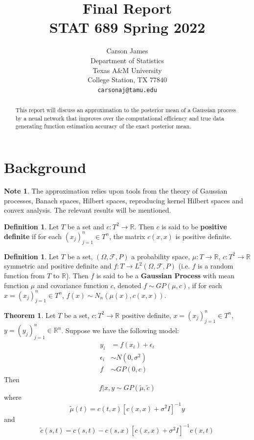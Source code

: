 \documentclass{article}
\title{Final Report \\ STAT 689 Spring 2022 }
\author{%
  Carson James\\
  Department of Statistics\\
  Texas A\&M University\\
  College Station, TX 77840 \\
  \texttt{carsonaj@tamu.edu} \\
}
\theoremstyle{definition}
\newtheorem{defn}[definition]{Definition}
\newtheorem{note}[definition]{Note}
\newtheorem{thm}[definition]{Theorem}
\newcommand{\ep}{\epsilon}
\newcommand{\sig}{\sigma}
\newcommand{\Om}{\Omega}
\newcommand{\R}{\mathbb{R}}
\newcommand{\MF}{\mathcal{F}}
\begin{document}
\maketitle

\begin{abstract}
  This report will discuss an approximation to the posterior mean of a Gaussian process by a neual network that improves over the computational efficiency and true data generating function estimation accuracy of the exact posterior mean. 
\end{abstract}

\section{Background}
\begin{note}
The approximation relies upon tools from the theory of Gaussian processes, Banach spaces, Hilbert spaces, reproducing kernel Hilbert spaces and convex analysis. The relevant results will be mentioned. 
\end{note}

\begin{defn}
Let $T$ be a set and $c: T^2 \rightarrow \R$. Then $c$ is said to be \textbf{positive definite} if for each $(x_j)_{j=1}^n \in T^n$, the matrix $c(x,x)$ is positive definite. 
\end{defn}

\begin{defn}
Let $T$ be a set, $(\Om, \MF, P)$ a probability space, $\mu : T \rightarrow \R$, $c: T^2 \rightarrow \R$ symmetric and positive definite and $f: T \rightarrow L^2(\Om, \MF, P)$ (i.e. $f$ is a random function from $T$ to $\R$). Then $f$ is said to be a \textbf{Gaussian Process} with mean function $\mu$ and covariance function $c$, denoted $f \sim GP(\mu, c)$, if for each $x = (x_j)_{j=1}^n \in T^n$, $f(x) \sim N_{n}(\mu(x), c(x,x))$. 
\end{defn}

\begin{thm}
Let $T$ be a set, $c: T^2 \rightarrow \R$ positive definite, $x = (x_j)_{j=1}^n \in T^n$, $y = (y_j)_{j=1}^n \in \R^n$. Suppose we have the following model:
\begin{align*}
y_i &= f(x_i) + \ep_i \\
\ep_i &\sim N(0, \sig^2) \\
f &\sim GP(0, c)
\end{align*}
Then $$f|x, y \sim GP(\tilde{\mu}, \tilde{c})$$ where $$\tilde{\mu}(t) = c(t, x)[c(x,x) + \sig^2I]^{-1}y$$ and $$\tilde{c}(s,t) = c(s,t) - c(s,x)[c(x,x) + \sig^2 I]^{-1}c(x,t)$$

\end{thm}
\end{document}
